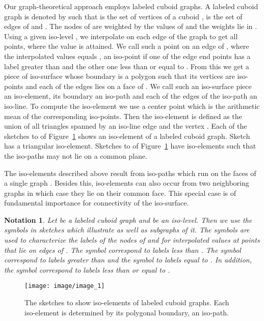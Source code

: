 \documentclass[a4paper,11pt]{article}
\newtheorem{notation}{Notation}
\begin{document}
Our graph-theoretical approach employs labeled cuboid graphs. A labeled cuboid graph is denoted by
 such that  is the set of vertices of a cuboid  , 
is the set of edges of  and . The nodes of  are weighted
by the values of  and the weights lie in . Using a given iso-level ,
we interpolate on each edge of the graph to get all points, where the value  is attained.
We call such a point on an edge of , where the interpolated values equals , an iso-point if one
of the edge end points has a label greater than  and the other one less than or equal to . From
this we get a piece of iso-surface whose boundary is a polygon such that its vertices
are iso-points and each of the edges lies on a face of . We call such an iso-surface piece an iso-element, its
boundary an iso-path and each of the edges of the iso-path an iso-line. To compute the iso-element we use
a center point  which is the arithmetic mean of the corresponding iso-points.
Then the iso-element is defined as the union of all triangles spanned by an iso-line edge and the vertex .
Each of the sketches  to  of Figure~\ref{image_1} shows an iso-element of a labeled
cuboid graph. Sketch  has a triangular iso-element. Sketches  to  of
Figure~\ref{image_1} have iso-elements such that the iso-paths may not lie on a common plane.

The iso-elements described above result from iso-paths which run on the faces of a single graph .
Besides this, iso-elements can also occur from two neighboring graphs in which case they lie on their common
face. This special case is of fundamental importance for connectivity of the iso-surface.

\begin{notation}
Let  be a labeled cuboid graph and  be an iso-level. Then we use the symbols
 in sketches which illustrate  as well as subgraphs
of it. The symbols are used to characterize the labels of the nodes of  and for interpolated values at points
that lie on edges of . The symbol  correspond to labels less than . The symbol 
correspond to labels greater than  and the symbol  to labels equal to . In addition, the symbol
 correspond to labels less than or equal to .
\label{int:not-1}
\end{notation}
\begin{figure}[!ht]
\texttt{[image: image/image\_1]}
\caption{The sketches  to  show iso-elements of labeled cuboid graphs. Each iso-element
is determined by its polygonal boundary, an iso-path.}
\label{image_1}
\end{figure}
\FloatBarrier
\end{document}
